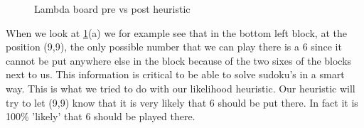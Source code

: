 \documentclass{report}
\begin{document}
\begin{figure}[h]
    \centering
    \qquad
    \caption{Lambda board pre vs post heuristic}%
    \label{fig:classic_heuristic}%
\end{figure}
When we look at \ref{fig:classic_heuristic}(a) we for example see that in the bottom left block, at the position (9,9), the only possible number that we can play there is a 6 since it cannot be put anywhere else in the block because of the two sixes of the blocks next to us. This information is critical to be able to solve sudoku's in a smart way. This is what we tried to do with our likelihood heuristic. Our heuristic will try to let (9,9) know that it is very likely that 6 should be put there. In fact it is 100\% 'likely' that 6 should be played there.
\newline
\newline
\newline
\end{document}
